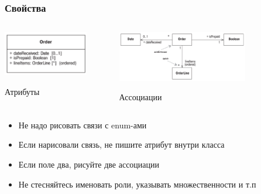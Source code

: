 \documentclass[xetex,mathserif,serif]{beamer}
\begin{document}
    \begin{frame}
        \frametitle{Свойства}
        \begin{columns}
            \begin{column}{0.3\textwidth}
                \begin{center}
                    \includegraphics[width=0.8\textwidth]{attributes.png}

                    Атрибуты
                \end{center}
            \end{column}
            \begin{column}{0.7\textwidth}
                \begin{center}
                    \includegraphics[width=0.7\textwidth]{associations.png}

                    Ассоциации
                \end{center}
            \end{column}
        \end{columns}
        \bigskip
        \begin{itemize}
            \item Не надо рисовать связи с enum-ами
            \item Если нарисовали связь, не пишите атрибут внутри класса
            \item Если поле два, рисуйте две ассоциации
            \item Не стесняйтесь именовать роли, указывать множественности и т.п
        \end{itemize}
    \end{frame}
\end{document}
